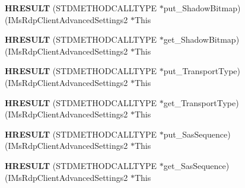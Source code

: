 \begin{DoxyCompactItemize}
\item 
\mbox{\label{struct_i_ms_rdp_client_advanced_settings2_vtbl_a884a56caa78db7d8e5ed1396dffd1d27}} 
{\bfseries H\+R\+E\+S\+U\+LT} (S\+T\+D\+M\+E\+T\+H\+O\+D\+C\+A\+L\+L\+T\+Y\+PE $\ast$put\+\_\+\+Shadow\+Bitmap)(I\+Ms\+Rdp\+Client\+Advanced\+Settings2 $\ast$This
\item 
\mbox{\label{struct_i_ms_rdp_client_advanced_settings2_vtbl_ad264db2292599f5171d2c76e8dde7f16}} 
{\bfseries H\+R\+E\+S\+U\+LT} (S\+T\+D\+M\+E\+T\+H\+O\+D\+C\+A\+L\+L\+T\+Y\+PE $\ast$get\+\_\+\+Shadow\+Bitmap)(I\+Ms\+Rdp\+Client\+Advanced\+Settings2 $\ast$This
\item 
\mbox{\label{struct_i_ms_rdp_client_advanced_settings2_vtbl_ac1620f32441bbe3186ce357f9cfaaa85}} 
{\bfseries H\+R\+E\+S\+U\+LT} (S\+T\+D\+M\+E\+T\+H\+O\+D\+C\+A\+L\+L\+T\+Y\+PE $\ast$put\+\_\+\+Transport\+Type)(I\+Ms\+Rdp\+Client\+Advanced\+Settings2 $\ast$This
\item 
\mbox{\label{struct_i_ms_rdp_client_advanced_settings2_vtbl_ab4e53d7aadfb431a86bbcb06f8a7e305}} 
{\bfseries H\+R\+E\+S\+U\+LT} (S\+T\+D\+M\+E\+T\+H\+O\+D\+C\+A\+L\+L\+T\+Y\+PE $\ast$get\+\_\+\+Transport\+Type)(I\+Ms\+Rdp\+Client\+Advanced\+Settings2 $\ast$This
\item 
\mbox{\label{struct_i_ms_rdp_client_advanced_settings2_vtbl_a1fae224b8705919d1411721916fee3ee}} 
{\bfseries H\+R\+E\+S\+U\+LT} (S\+T\+D\+M\+E\+T\+H\+O\+D\+C\+A\+L\+L\+T\+Y\+PE $\ast$put\+\_\+\+Sas\+Sequence)(I\+Ms\+Rdp\+Client\+Advanced\+Settings2 $\ast$This
\item 
\mbox{\label{struct_i_ms_rdp_client_advanced_settings2_vtbl_a0d808fd04bf6f7fc9ea8433867c9bdf9}} 
{\bfseries H\+R\+E\+S\+U\+LT} (S\+T\+D\+M\+E\+T\+H\+O\+D\+C\+A\+L\+L\+T\+Y\+PE $\ast$get\+\_\+\+Sas\+Sequence)(I\+Ms\+Rdp\+Client\+Advanced\+Settings2 $\ast$This
\item 
\mbox{\label{struct_i_ms_rdp_client_advanced_settings2_vtbl_aa7116bee0005c8d651933f45fc99cc12}} 

\end{DoxyCompactItemize}

